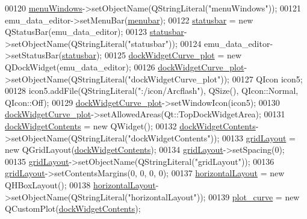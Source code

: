 \begin{DoxyCode}
00120         \hyperlink{a00026_a0c7cba2d30d21689f48f1981e976c0b6}{menuWindows}->setObjectName(QStringLiteral(\textcolor{stringliteral}{"menuWindows"}));
00121         emu\_data\_editor->setMenuBar(\hyperlink{a00026_af09fe2fe1f34525f5caeb5ada7d297bf}{menubar});
00122         \hyperlink{a00026_ab06a6e9bb964fc017cb9a246ee1f9ecb}{statusbar} = \textcolor{keyword}{new} QStatusBar(emu\_data\_editor);
00123         \hyperlink{a00026_ab06a6e9bb964fc017cb9a246ee1f9ecb}{statusbar}->setObjectName(QStringLiteral(\textcolor{stringliteral}{"statusbar"}));
00124         emu\_data\_editor->setStatusBar(\hyperlink{a00026_ab06a6e9bb964fc017cb9a246ee1f9ecb}{statusbar});
00125         \hyperlink{a00026_a0edc87fb115fede171c0da1f99000874}{dockWidgetCurve\_plot} = \textcolor{keyword}{new} QDockWidget(emu\_data\_editor);
00126         \hyperlink{a00026_a0edc87fb115fede171c0da1f99000874}{dockWidgetCurve\_plot}->setObjectName(QStringLiteral(\textcolor{stringliteral}{"dockWidgetCurve\_plot"}));
00127         QIcon icon5;
00128         icon5.addFile(QStringLiteral(\textcolor{stringliteral}{":/icon/Arcflash"}), QSize(), QIcon::Normal, QIcon::Off);
00129         \hyperlink{a00026_a0edc87fb115fede171c0da1f99000874}{dockWidgetCurve\_plot}->setWindowIcon(icon5);
00130         \hyperlink{a00026_a0edc87fb115fede171c0da1f99000874}{dockWidgetCurve\_plot}->setAllowedAreas(Qt::TopDockWidgetArea);
00131         \hyperlink{a00026_a78f9e81c1adc0092b7e4d6efb640dc43}{dockWidgetContents} = \textcolor{keyword}{new} QWidget();
00132         \hyperlink{a00026_a78f9e81c1adc0092b7e4d6efb640dc43}{dockWidgetContents}->setObjectName(QStringLiteral(\textcolor{stringliteral}{"dockWidgetContents"}));
00133         \hyperlink{a00026_ad06b82b83a9a74377d6ca44ae699f945}{gridLayout} = \textcolor{keyword}{new} QGridLayout(\hyperlink{a00026_a78f9e81c1adc0092b7e4d6efb640dc43}{dockWidgetContents});
00134         \hyperlink{a00026_ad06b82b83a9a74377d6ca44ae699f945}{gridLayout}->setSpacing(0);
00135         \hyperlink{a00026_ad06b82b83a9a74377d6ca44ae699f945}{gridLayout}->setObjectName(QStringLiteral(\textcolor{stringliteral}{"gridLayout"}));
00136         \hyperlink{a00026_ad06b82b83a9a74377d6ca44ae699f945}{gridLayout}->setContentsMargins(0, 0, 0, 0);
00137         \hyperlink{a00026_ad3009fa6ef8958b3e052715beba75d28}{horizontalLayout} = \textcolor{keyword}{new} QHBoxLayout();
00138         \hyperlink{a00026_ad3009fa6ef8958b3e052715beba75d28}{horizontalLayout}->setObjectName(QStringLiteral(\textcolor{stringliteral}{"horizontalLayout"}));
00139         \hyperlink{a00026_a1d46308dee8db7e3c99af65f13055479}{plot\_curve} = \textcolor{keyword}{new} QCustomPlot(\hyperlink{a00026_a78f9e81c1adc0092b7e4d6efb640dc43}{dockWidgetContents});

\end{DoxyCode}

